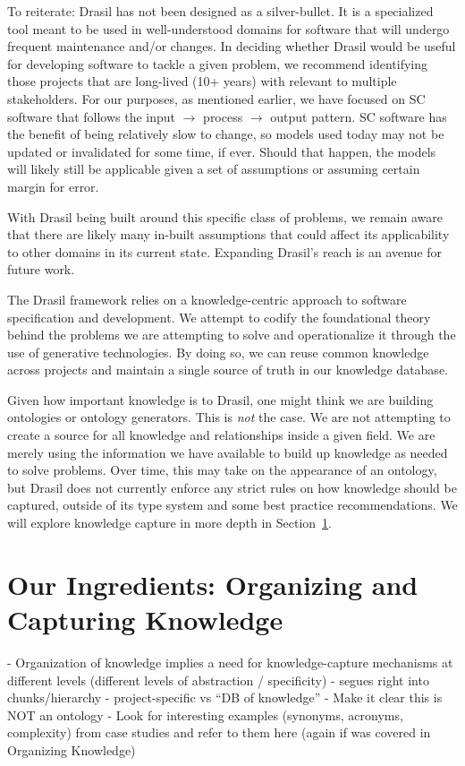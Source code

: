 To reiterate: Drasil has not been designed as a silver-bullet. It is a 
specialized tool meant to be used in well-understood domains for software that 
will undergo frequent maintenance and/or changes. In deciding whether Drasil 
would be useful for developing software to tackle a given problem, we recommend 
identifying those projects that are long-lived (10+ years) with \sfs{} 
relevant to multiple stakeholders. For our purposes, as mentioned earlier, we 
have focused on SC software that follows the input $\rightarrow$ process 
$\rightarrow$ output pattern. SC software has the benefit of being relatively 
slow to change, so models used today may not be updated or invalidated for some 
time, if ever. Should that happen, the models will likely still be applicable 
given a set of assumptions or assuming certain margin for error.

With Drasil being built around this specific class of problems, we remain aware 
that there are likely many in-built assumptions that could affect its 
applicability to other domains in its current state. Expanding Drasil's reach 
is an avenue for future work.

The Drasil framework relies on a knowledge-centric approach to software 
specification and development. We attempt to codify the foundational theory 
behind the problems we are attempting to solve and operationalize it through 
the use of generative technologies. By doing so, we can reuse common knowledge 
across projects and maintain a single source of truth in our knowledge database.

Given how important knowledge is to Drasil, one might think we are building 
ontologies or ontology generators. This is \emph{not} the case. We are not 
attempting to create a source for all knowledge and relationships inside a 
given field. We are merely using the information we have available to build up 
knowledge as needed to solve problems. Over time, this may take on the 
appearance of an ontology, but Drasil does not currently enforce any strict 
rules on how knowledge should be captured, outside of its type system and some 
best practice recommendations. We will explore knowledge capture in more depth 
in Section~\ref{sec:kc}.

\section{Our Ingredients: Organizing and Capturing Knowledge}
\label{sec:kc}
  - Organization of knowledge implies a need for knowledge-capture mechanisms 
    at different levels (different levels of abstraction / specificity)
  - segues right into chunks/hierarchy
   - project-specific vs “DB of knowledge”
   - Make it clear this is NOT an ontology
   - Look for interesting examples (synonyms, acronyms, complexity) from case studies and refer to them here (again if was covered in Organizing Knowledge)

